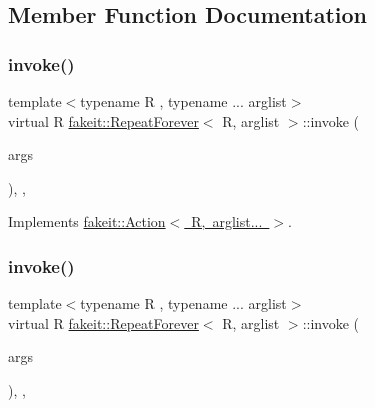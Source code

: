 \subsection{Member Function Documentation}
\mbox{\label{structfakeit_1_1RepeatForever_a9fcab18dc26a1f74a22e82a775f06ea6}} 
\subsubsection{\texorpdfstring{invoke()}{invoke()}\hspace{0.1cm}{\footnotesize\ttfamily [1/9]}}
{\footnotesize\ttfamily template$<$typename R , typename ... arglist$>$ \\
virtual R \mbox{\hyperlink{structfakeit_1_1RepeatForever}{fakeit\+::\+Repeat\+Forever}}$<$ R, arglist $>$\+::invoke (\begin{DoxyParamCaption}\item[{const \mbox{\hyperlink{namespacefakeit_a476a37a598825e1b5dd67b3a176491a1}{Arguments\+Tuple}}$<$ arglist... $>$ \&}]{args }\end{DoxyParamCaption})\hspace{0.3cm}{\ttfamily [inline]}, {\ttfamily [override]}, {\ttfamily [virtual]}}



Implements \mbox{\hyperlink{structfakeit_1_1Action_a85503300bf8134ce55761db5f643b00c}{fakeit\+::\+Action$<$ R, arglist... $>$}}.

\mbox{\label{structfakeit_1_1RepeatForever_a9fcab18dc26a1f74a22e82a775f06ea6}} 
\subsubsection{\texorpdfstring{invoke()}{invoke()}\hspace{0.1cm}{\footnotesize\ttfamily [2/9]}}
{\footnotesize\ttfamily template$<$typename R , typename ... arglist$>$ \\
virtual R \mbox{\hyperlink{structfakeit_1_1RepeatForever}{fakeit\+::\+Repeat\+Forever}}$<$ R, arglist $>$\+::invoke (\begin{DoxyParamCaption}\item[{const \mbox{\hyperlink{namespacefakeit_a476a37a598825e1b5dd67b3a176491a1}{Arguments\+Tuple}}$<$ arglist... $>$ \&}]{args }\end{DoxyParamCaption})\hspace{0.3cm}{\ttfamily [inline]}, {\ttfamily [override]}, {\ttfamily [virtual]}}



